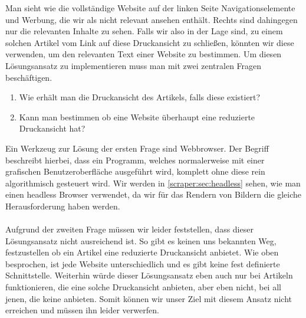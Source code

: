 Man sieht wie die vollständige Website auf der linken Seite Navigationselemente und Werbung, die wir als nicht relevant ansehen enthält. Rechts sind dahingegen nur die relevanten Inhalte zu sehen. Falls wir also in der Lage sind, zu einem solchen Artikel vom Link auf diese Druckansicht zu schließen, könnten wir diese verwenden, um den relevanten Text einer Website zu bestimmen. Um diesen Lösungsansatz zu implementieren muss man mit zwei zentralen Fragen beschäftigen.
\begin{enumerate}
	\item Wie erhält man die Druckansicht des Artikels, falls diese existiert?
	\item Kann man bestimmen ob eine Website überhaupt eine reduzierte Druckansicht hat? 
\end{enumerate}
Ein Werkzeug zur Lösung der ersten Frage sind  Webbrowser. Der Begriff  beschreibt hierbei, dass ein Programm, welches normalerweise mit einer grafischen Benutzeroberfläche ausgeführt wird, komplett ohne diese rein algorithmisch gesteuert wird. Wir werden in \autoref{scraper:sec:headless} sehen, wie man einen headless Browser verwendet, da wir für das Rendern von Bildern die gleiche Herausforderung haben werden. \\ \\
Aufgrund der zweiten Frage müssen wir leider feststellen, dass dieser Lösungsansatz nicht ausreichend ist. So gibt es keinen uns bekannten Weg, festzustellen ob ein Artikel eine reduzierte Druckansicht anbietet. Wie oben besprochen, ist jede Website unterschiedlich und es gibt keine fest definierte Schnittstelle. Weiterhin würde dieser Lösungsansatz eben auch nur bei Artikeln funktionieren, die eine solche Druckansicht anbieten, aber eben nicht, bei all jenen, die keine anbieten. Somit können wir unser Ziel mit diesem Ansatz nicht erreichen und müssen ihn leider verwerfen.


